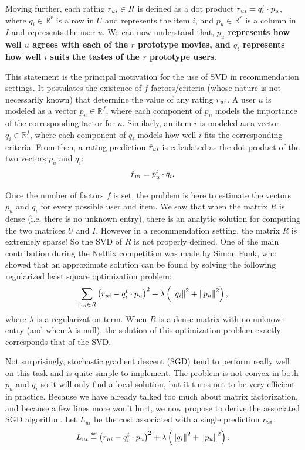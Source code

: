 Moving further, each rating $r_{ui} \in R$ is defined as a dot product $r_{ui} =
q_i^t \cdot p_u$, where $q_i \in \mathbb{R}^r$ is a row in $U$ and represents
the item $i$, and $p_u \in \mathbb{R}^r$ is a column in $I$ and represents the
user $u$. We can now understand that, \textbf{$p_u$ represents how well $u$
agrees with each of the $r$ prototype movies, and $q_i$ represents how well $i$
suits the tastes of the $r$ prototype users}.

This statement is the principal motivation for the use of SVD in recommendation
settings. It postulates the existence of $f$ factors/criteria (whose nature is
not necessarily known) that determine the value of any rating $r_{ui}$.  A user
$u$ is modeled as a vector $p_u \in \mathbb{R}^f$, where each component of
$p_u$ models the importance of the corresponding factor for $u$.  Similarly, an
item $i$ is modeled as a vector $q_i \in \mathbb{R}^f$, where each component of
$q_i$ models how well $i$ fits the corresponding criteria.  From then, a rating
prediction $\hat{r}_{ui}$ is calculated as the dot product of the two vectors $p_u$
and $q_i$:
$$\hat{r}_{ui} = p_u^t \cdot q_i.$$

Once the number of factors $f$ is set, the problem is here to estimate the
vectors $p_u$ and $q_i$ for every possible user and item. We saw that when the
matrix $R$ is dense (i.e. there is no unknown entry), there is an analytic
solution for computing the two matrices $U$ and $I$. However in a
recommendation setting, the matrix $R$ is extremely sparse! So the SVD of $R$
is not properly defined. One of the main contribution during the Netflix
competition was made by Simon Funk, who showed that an approximate solution can
be found by solving the following regularized least square optimization
problem:
$$
\sum_{r_{ui} \in R} \left(r_{ui} - q_i^t \cdot p_u \right)^2 +
\lambda\left({\left\lVert q_i\right\rVert}_{}^2 + {\left\lVert p_u\right\rVert}_{}^2\right),
$$
where $\lambda$ is a regularization term.  When $R$ is a dense matrix with no
unknown entry (and when $\lambda$ is null), the solution of this optimization
problem exactly corresponds that of the SVD.

Not surprisingly, stochastic gradient descent (SGD) tend to perform really well on
this task and is quite simple to implement. The problem is not convex in both
$p_u$ and $q_i$ so it will only find a local solution, but it turns out to be
very efficient in practice. Because we have already talked too much about
matrix factorization, and because a few lines more won't hurt, we now propose
to derive the associated SGD algorithm. Let $L_{ui}$ be the cost associated
with a single prediction $r_{ui}$:
$$L_{ui} \eqdef \left(\rui - q_i^t \cdot p_u \right)^2 +
\lambda\left(\norm{}{q_i}^2 + \norm{}{p_u}^2\right).$$

